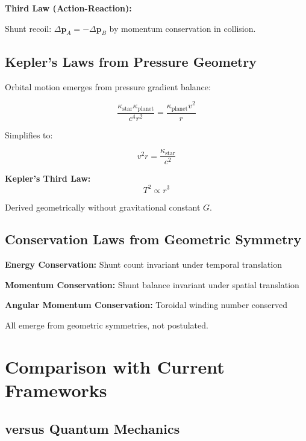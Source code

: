 \textbf{Third Law (Action-Reaction):}

Shunt recoil: $\Delta \mathbf{p}_A = -\Delta \mathbf{p}_B$ by momentum conservation in collision.

\subsection{Kepler's Laws from Pressure Geometry}

Orbital motion emerges from pressure gradient balance:

\begin{equation}
\frac{\kappa_{\text{star}} \kappa_{\text{planet}}}{c^4 r^2} = \frac{\kappa_{\text{planet}} v^2}{r}
\end{equation}

Simplifies to:

\begin{equation}
v^2 r = \frac{\kappa_{\text{star}}}{c^2}
\end{equation}

\textbf{Kepler's Third Law:}
\begin{equation}
T^2 \propto r^3
\end{equation}

Derived geometrically without gravitational constant $G$.

\subsection{Conservation Laws from Geometric Symmetry}

\textbf{Energy Conservation:} Shunt count invariant under temporal translation

\textbf{Momentum Conservation:} Shunt balance invariant under spatial translation

\textbf{Angular Momentum Conservation:} Toroidal winding number conserved

All emerge from geometric symmetries, not postulated.

\section{Comparison with Current Frameworks}

\subsection{versus Quantum Mechanics}

